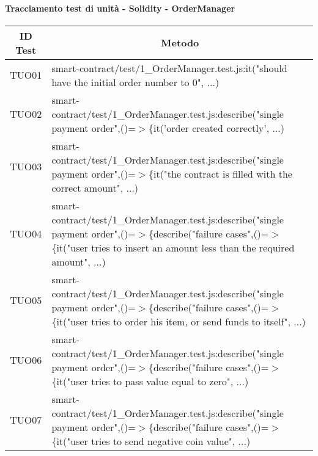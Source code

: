 


\paragraph{Tracciamento test di unità - Solidity - OrderManager}\label{paragraph:tracciamento_TUO}

\begin{table}[H]
  \centering
  \renewcommand{\arraystretch}{1.8}
  \begin{tabular}{c|p{15cm}}
    \rowcolor[HTML]{125E28}
    \color[HTML]{FFFFFF}\textbf{ID Test}
         & \multicolumn{1}{c}{\color[HTML]{FFFFFF}\textbf{Metodo}}                                                                                       \\
    \hline
    TUO01 & smart-contract/test/1\_OrderManager.test.js:it("should have the initial order number to 0", ...)                                                                                        \\
    TUO02 & smart-contract/test/1\_OrderManager.test.js:describe("single payment order",\newline()=$>$\{it('order created correctly', ...)                                      \\
    TUO03 & smart-contract/test/1\_OrderManager.test.js:describe("single payment order",\newline()=$>$\{it("the contract is filled with the correct amount", ...) \\
    TUO04 & smart-contract/test/1\_OrderManager.test.js:describe("single payment order",\newline()=$>$\{describe("failure cases",()=$>$\{it("user tries to insert an amount less than the required amount", ...)                                                                                       \\
    TUO05 & smart-contract/test/1\_OrderManager.test.js:describe("single payment order",\newline()=$>$\{describe("failure cases",()=$>$\{it("user tries to order his item, or send funds to itself", ...)                                \\
    TUO06 & smart-contract/test/1\_OrderManager.test.js:describe("single payment order",\newline()=$>$\{describe("failure cases",()=$>$\{it("user tries to pass value equal to zero", ...)                                  \\
    TUO07 & smart-contract/test/1\_OrderManager.test.js:describe("single payment order",\newline()=$>$\{describe("failure cases",()=$>$\{it("user tries to send negative coin value", ...)                                          \\

\end{tabular}
\end{table}
